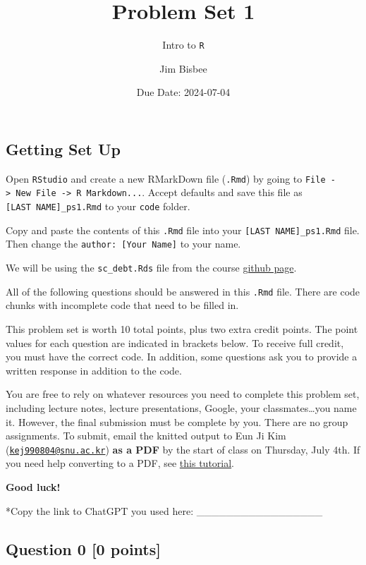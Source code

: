 \documentclass[
]{article}
\title{Problem Set 1}
\subtitle{Intro to \texttt{R}}
\author{Jim Bisbee}
\date{Due Date: 2024-07-04}
\begin{document}
\maketitle

\subsection{Getting Set Up}\label{getting-set-up}

Open \texttt{RStudio} and create a new RMarkDown file (\texttt{.Rmd}) by
going to
\texttt{File\ -\textgreater{}\ New\ File\ -\textgreater{}\ R\ Markdown...}.
Accept defaults and save this file as \texttt{{[}LAST\ NAME{]}\_ps1.Rmd}
to your \texttt{code} folder.

Copy and paste the contents of this \texttt{.Rmd} file into your
\texttt{{[}LAST\ NAME{]}\_ps1.Rmd} file. Then change the
\texttt{author:\ {[}Your\ Name{]}} to your name.

We will be using the \texttt{sc\_debt.Rds} file from the course
\href{https://github.com/jbisbee1/ISP_Data_Science_2024/blob/main/data/sc_debt.Rds}{github
page}.

All of the following questions should be answered in this \texttt{.Rmd}
file. There are code chunks with incomplete code that need to be filled
in.

This problem set is worth 10 total points, plus two extra credit points.
The point values for each question are indicated in brackets below. To
receive full credit, you must have the correct code. In addition, some
questions ask you to provide a written response in addition to the code.

You are free to rely on whatever resources you need to complete this
problem set, including lecture notes, lecture presentations, Google,
your classmates\ldots you name it. However, the final submission must be
complete by you. There are no group assignments. To submit, email the
knitted output to Eun Ji Kim
(\href{mailto:kej990804@snu.ac.kr}{\nolinkurl{kej990804@snu.ac.kr}})
\textbf{as a PDF} by the start of class on Thursday, July 4th. If you
need help converting to a PDF, see
\href{https://github.com/jbisbee1/ISP_Data_Science_2024/blob/main/Psets/ISP_pset_0_HELPER.pdf}{this
tutorial}.

\textbf{Good luck!}

*Copy the link to ChatGPT you used here:
\_\_\_\_\_\_\_\_\_\_\_\_\_\_\_\_\_

\subsection{Question 0 {[}0 points{]}}\label{question-0-0-points}
\end{document}

